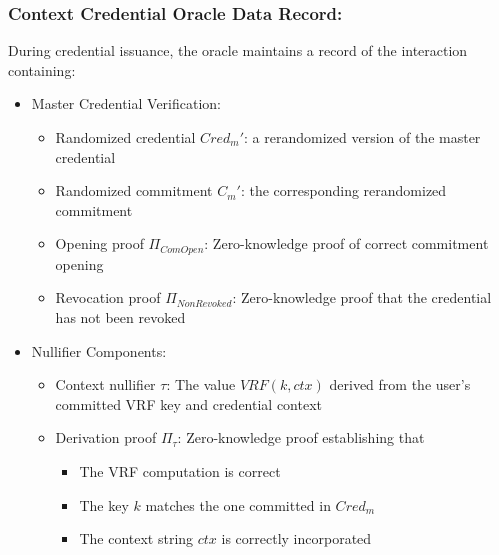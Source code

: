 {\subsubsection{Context Credential Oracle Data Record:} During credential issuance, the oracle maintains a record of the interaction containing:
\begin{itemize}
    \item Master Credential Verification: 
        \begin{itemize}
            \item Randomized credential $Cred_m'$: a rerandomized version of the master credential
            \item Randomized commitment $C_m'$: the corresponding rerandomized commitment
            \item Opening proof $\Pi_{ComOpen}$: Zero-knowledge proof of correct commitment opening
            \item Revocation proof $\Pi_{NonRevoked}$:  Zero-knowledge proof that the credential has not been revoked
        \end{itemize}
    \item Nullifier Components:
    \begin{itemize}
        \item Context nullifier $\tau$: The value $VRF(k,ctx)$ derived from the user's committed VRF key and credential context
        \item Derivation proof $\Pi_{\tau}$: Zero-knowledge proof establishing that
        \begin{itemize}
            \item The VRF computation is correct
            \item The key $k$ matches the one committed in $Cred_m$
            \item The context string $ctx$ is correctly incorporated
        \end{itemize}
    \end{itemize}
\end{itemize}

}
